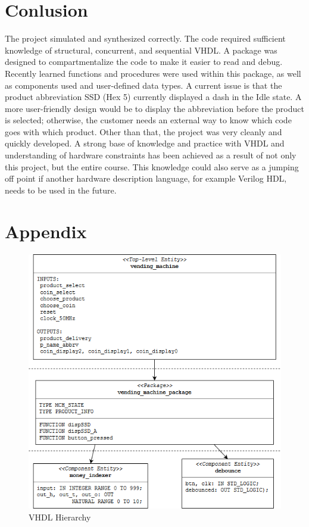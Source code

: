 \documentclass[12pt]{article}
\begin{document}
\section{Conlusion} \label{cncl}
The project simulated and synthesized correctly.  The code required sufficient knowledge of structural, concurrent, and sequential VHDL. A package was designed to compartmentalize the code to make it easier to read and debug.  Recently learned functions and procedures were used within this package, as well as components used and user-defined data types.  A current issue is that the product abbreviation SSD (Hex 5) currently displayed a dash in the Idle state.  A more user-friendly design would be to display the abbreviation before the product is selected; otherwise, the customer needs an external way to know which code goes with which product.  Other than that, the project was very cleanly and quickly developed.  A strong base of knowledge and practice with VHDL and understanding of hardware constraints has been achieved as a result of not only this project, but the entire course.  This knowledge could also serve as a jumping off point if another hardware description language, for example Verilog HDL, needs to be used in the future.

\newpage

\section*{Appendix} \label{appendix}

\renewcommand{\thefigure}{A.\arabic{figure}}

\setcounter{figure}{0}

\begin{figure}[H]
\begin{center}
\includegraphics[scale=0.75]{BlockDiagram.png}
\caption{VHDL Hierarchy}
\label{fig:appendix1}
\end{center}
\end{figure}
\end{document}
